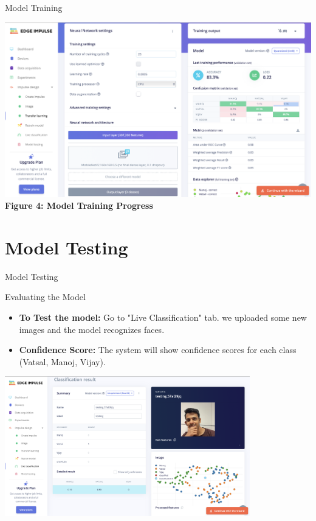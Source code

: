 \documentclass[10pt, a4paper]{beamer}
\begin{document}
\begin{frame}{Model Training}
	
		\centering
	\includegraphics[width=1.0\textwidth]{images/Accuracy.png} %
	\textbf{Figure 4: Model Training Progress}
	
\end{frame}


	\section{Model Testing}
\begin{frame}{Model Testing}
	\begin{block}{Evaluating the Model}
		\begin{itemize}
			\item  \textbf{To Test the model:} Go to "Live Classification" tab. we uploaded some new images and the model recognizes faces.
			\item  \textbf{Confidence Score:} The system will show confidence scores for each class (Vatsal, Manoj, Vijay).
		\end{itemize}
\end{block}

\centering
\includegraphics[width=0.8\textwidth]{images/Test.png} 

\end{frame}
\end{document}
